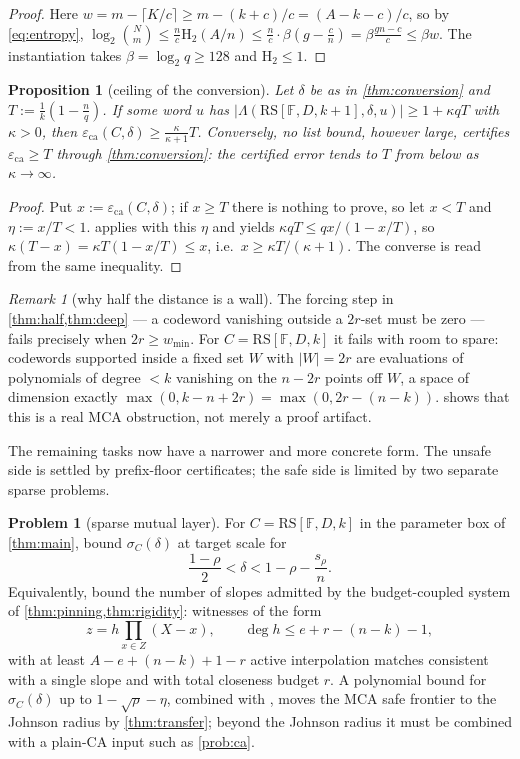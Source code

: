 \documentclass[11pt]{amsart}
\newtheorem{proposition}[proposition]{Proposition}
\theoremstyle{definition}
\newtheorem{problem}[problem]{Problem}
\theoremstyle{remark}
\newtheorem{remark}[remark]{Remark}
\newcommand{\F}{\mathbb{F}}
\newcommand{\RS}{\mathrm{RS}}
\newcommand{\eca}{\varepsilon_{\mathrm{ca}}}
\newcommand{\Lst}{\Lambda}
\newcommand{\Hb}{\mathrm{H}_2}
\begin{document}
\begin{proof}
Here $w=m-\lceil K/c\rceil\ge m-(k+c)/c=(A-k-c)/c$, so by \eqref{eq:entropy},
$\log_2\binom Nm\le\frac nc\Hb(A/n)\le\frac nc\cdot\beta(g-\frac cn)=\beta\frac{gn-c}c\le\beta w$. The instantiation takes $\beta=\log_2q\ge128$ and $\Hb\le1$.
\end{proof}

\begin{proposition}[ceiling of the conversion]\label{prop:ceiling}
Let $\delta$ be as in \cref{thm:conversion} and
$T:=\frac1k(1-\frac nq)$. If some word $u$ has
$|\Lst(\RS[\F,D,k+1],\delta,u)|\ge1+\kappa qT$ with $\kappa>0$, then
$\eca(C,\delta)\ge\frac{\kappa}{\kappa+1}T$. Conversely, no list bound, however
large, certifies $\eca\ge T$ through \cref{thm:conversion}: the certified error
tends to $T$ from below as $\kappa\to\infty$.
\end{proposition}

\begin{proof}
Put $x:=\eca(C,\delta)$; if $x\ge T$ there is nothing to prove, so let
$x<T$ and $\eta:=x/T<1$.  applies with this $\eta$ and
yields $\kappa qT\le qx/(1-x/T)$, so
$\kappa(T-x)=\kappa T(1-x/T)\le x$, i.e.\ $x\ge\kappa T/(\kappa+1)$. The converse
is read from the same inequality.
\end{proof}

\begin{remark}[why half the distance is a wall]\label{rem:wall}
The forcing step in \cref{thm:half,thm:deep} --- a codeword vanishing outside a
$2r$-set must be zero --- fails precisely when $2r\ge w_{\min}$.  For
$C=\RS[\F,D,k]$ it fails with room to spare: codewords supported inside a fixed
set $W$ with $|W|=2r$ are evaluations of polynomials of degree $<k$ vanishing on
the $n-2r$ points off $W$, a space of dimension exactly
$\max(0,k-n+2r)=\max(0,2r-(n-k))$.   shows that this is
a real MCA obstruction, not merely a proof artifact.
\end{remark}

The remaining tasks now have a narrower and more concrete form.  The unsafe side is settled by prefix-floor certificates; the safe side is limited by two separate sparse problems.

\begin{problem}[sparse mutual layer]\label{prob:mutual}\label{prob:sparse-mutual}
For $C=\RS[\F,D,k]$ in the parameter box of \cref{thm:main}, bound $\sigma_C(\delta)$ at target scale for
\[
        \frac{1-\rho}{2}<\delta<1-\rho-\frac{s_\rho}{n}.
\]
Equivalently, bound the number of slopes admitted by the budget-coupled system of \cref{thm:pinning,thm:rigidity}: witnesses of the form
\[
        z=h\prod_{x\in Z}(X-x),\qquad \deg h\le e+r-(n-k)-1,
\]
with at least $A-e+(n-k)+1-r$ active interpolation matches consistent with a single slope and with total closeness budget $r$.  A polynomial bound for $\sigma_C(\delta)$ up to $1-\sqrt\rho-\eta$, combined with \cite{BCIKS20}, moves the MCA safe frontier to the Johnson radius by \cref{thm:transfer}; beyond the Johnson radius it must be combined with a plain-CA input such as \cref{prob:ca}.
\end{problem}
\end{document}
